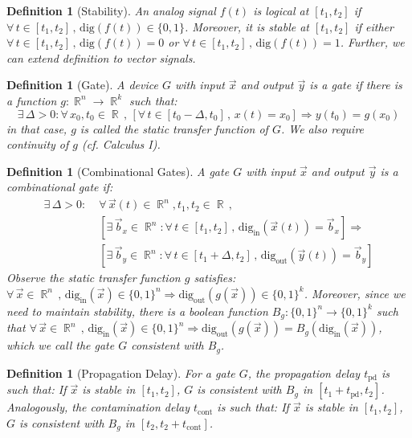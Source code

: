 \documentclass[12pt]{article}
\let\RA\Rightarrow
\newcommand{\Forall}[1]{\forall\,{#1}\,,\,}
\newcommand{\Exist}[1]{\exists\,{#1}:}
\DeclareMathOperator{\R}{\mathbb{R}}
\newcommand*{\B}{\{0,1\}}
\newtheorem{definition}[theorem]{Definition}
\begin{document}
\begin{definition}[Stability]
  An analog signal $f(t)$ is logical at $[t_1,t_2]$ if $\Forall{t\in[t_1,t_2]}\text{dig}(f(t))\in\B$. Moreover, it is stable at $[t_1,t_2]$ if either $\Forall{t\in[t_1,t_2]}\text{dig}(f(t))=0$ or $\Forall{t\in[t_1,t_2]}\text{dig}(f(t))=1$. Further, we can extend definition to vector signals.
\end{definition}

\begin{definition}[Gate]
  A device $G$ with input $\vec{x}$ and output $\vec{y}$ is a gate if there is a function $g:\R^n\to\R^k$ such that: $$\Exist{\Delta>0}\Forall{x_0,t_0\in\R}[\Forall{t\in[t_0-\Delta,t_0]}x(t)=x_0]\RA y(t_0)=g(x_0)$$ in that case, $g$ is called the static transfer function of $G$. We also require continuity of $g$ (cf. Calculus I).
\end{definition}

\begin{definition}[Combinational Gates]
  A gate $G$ with input $\vec{x}$ and output $\vec{y}$ is a combinational gate if: 
  \begin{align*}
    \Exist{\Delta>0}\;&\Forall{\vec{x}(t)\in\R^n,t_1,t_2\in\R}\\
    &[\Exist{\vec{b}_x\in\R^n}\Forall{t\in[t_1,t_2]}\text{dig}_\text{in}(\vec{x}(t))=\vec{b}_x]\RA\\
    &[\Exist{\vec{b}_y\in\R^n}\Forall{t\in[t_1+\Delta,t_2]}\text{dig}_\text{out}(\vec{y}(t))=\vec{b}_y]
  \end{align*}
  Observe the static transfer function $g$ satisfies: $\Forall{\vec{x}\in\R^n}\text{dig}_\text{in}(\vec{x})\in\B^n\RA\text{dig}_\text{out}(g(\vec{x}))\in\B^k$. Moreover, since we need to maintain stability, there is a boolean function $B_g:\B^n\to\B^k$ such that $\Forall{\vec{x}\in\R^n}\text{dig}_\text{in}(\vec{x})\in\B^n\RA\text{dig}_\text{out}(g(\vec{x}))=B_g(\text{dig}_\text{in}(\vec{x}))$, which we call the gate $G$ consistent with $B_g$.
\end{definition}

\begin{definition}[Propagation Delay]
  For a gate $G$, the propagation delay $t_\text{pd}$ is such that: If $\vec{x}$ is stable in $[t_1,t_2]$, $G$ is consistent with $B_g$ in $[t_1+t_\text{pd},t_2]$. Analogously, the contamination delay $t_\text{cont}$ is such that: If $\vec{x}$ is stable in $[t_1,t_2]$, $G$ is consistent with $B_g$ in $[t_2,t_2+t_\text{cont}]$.
\end{definition}
\end{document}
